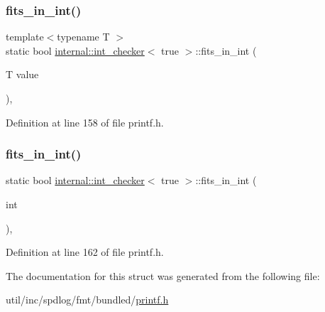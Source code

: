 \subsubsection{\texorpdfstring{fits\+\_\+in\+\_\+int()}{fits\_in\_int()}\hspace{0.1cm}{\footnotesize\ttfamily [1/2]}}
{\footnotesize\ttfamily template$<$typename T $>$ \\
static bool \hyperlink{structinternal_1_1int__checker}{internal\+::int\+\_\+checker}$<$ true $>$\+::fits\+\_\+in\+\_\+int (\begin{DoxyParamCaption}\item[{T}]{value }\end{DoxyParamCaption})\hspace{0.3cm}{\ttfamily [inline]}, {\ttfamily [static]}}



Definition at line 158 of file printf.\+h.

\mbox{\label{structinternal_1_1int__checker_3_01true_01_4_a253ca9ccc6a67e83bc66276e75e798fb}} 
\subsubsection{\texorpdfstring{fits\+\_\+in\+\_\+int()}{fits\_in\_int()}\hspace{0.1cm}{\footnotesize\ttfamily [2/2]}}
{\footnotesize\ttfamily static bool \hyperlink{structinternal_1_1int__checker}{internal\+::int\+\_\+checker}$<$ true $>$\+::fits\+\_\+in\+\_\+int (\begin{DoxyParamCaption}\item[{int}]{ }\end{DoxyParamCaption})\hspace{0.3cm}{\ttfamily [inline]}, {\ttfamily [static]}}



Definition at line 162 of file printf.\+h.



The documentation for this struct was generated from the following file\+:\begin{DoxyCompactItemize}
\item 
util/inc/spdlog/fmt/bundled/\hyperlink{printf_8h}{printf.\+h}\end{DoxyCompactItemize}
